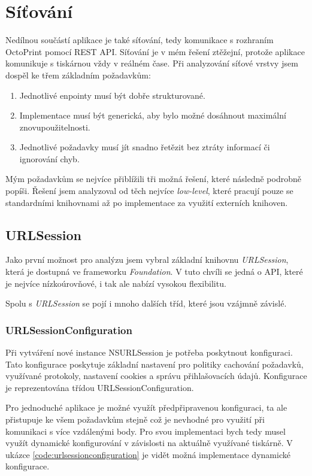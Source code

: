 \section{Síťování}\label{analyza-sitovani}

Nedílnou součástí aplikace je také síťování, tedy komunikace s rozhraním OctoPrint pomocí REST API.
Síťování je v mém řešení ztěžejní, protože aplikace komunikuje s tiskárnou vždy v reálném čase.
Při analyzování síťové vrstvy jsem dospěl ke třem základním požadavkům:

\begin{enumerate}
    \item Jednotlivé enpointy musí být dobře strukturované.
    \item Implementace musí být generická, aby bylo možné dosáhnout maximální znovupoužitelnosti.
    \item Jednotlivé požadavky musí jít snadno řetězit bez ztráty informací či ignorování chyb.
\end{enumerate}

Mým požadavkům se nejvíce přiblížili tři možná řešení, které následně podrobně popíši.
Řešení jsem analyzoval od těch nejvíce \textit{low-level}, které pracují pouze se standardními knihovnami až po implementace za využití externích knihoven.

\subsection{URLSession}

Jako první možnost pro analýzu jsem vybral základní knihovnu \textit{URLSession}, která je dostupná ve frameworku \textit{Foundation}.
V tuto chvíli se jedná o API, které je nejvíce nízkoúrovňové, i tak ale nabízí vysokou flexibilitu.

Spolu s \textit{URLSession} se pojí i mnoho dalších tříd, které jsou vzájmně závislé.

\subsubsection{URLSessionConfiguration}

Při vytváření nové instance NSURLSession je potřeba poskytnout konfiguraci.
Tato konfigurace poskytuje základní nastavení pro politiky cachování požadavků, využívané protokoly, nastavení cookies a správu přihlašovacích údajů.
Konfigurace je reprezentována třídou URLSessionConfiguration.

Pro jednoduché aplikace je možné využít předpřipravenou konfiguraci, ta ale přistupuje ke všem požadavkům stejně což je nevhodné pro využití při komunikaci s více vzdálenými body.
Pro svou implementaci bych tedy musel využít dynamické konfigurování v závislosti na aktuálně využívané tiskárně.
V ukázce \ref{code:urlsessionconfiguration} je vidět možná implementace dynamické konfigurace.

